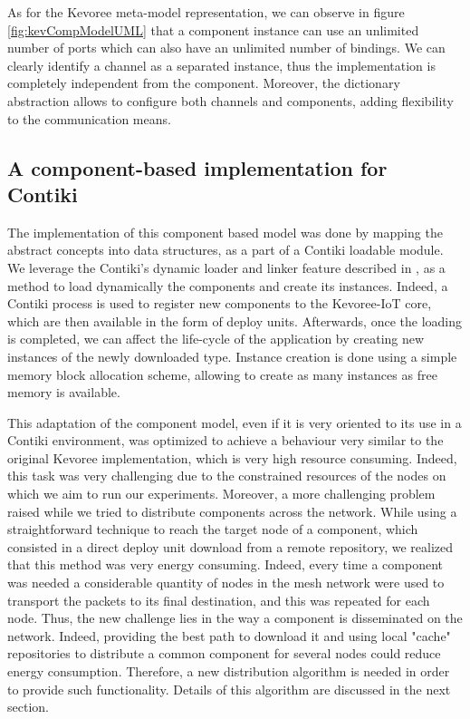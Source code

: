 As for the Kevoree meta-model representation, we can observe in figure \ref{fig:kevCompModelUML} that a component instance can use an unlimited number of ports which can also have an unlimited number of bindings.
We can clearly identify a channel as a separated instance, thus the implementation is completely independent from the component.
Moreover, the dictionary abstraction allows to configure both channels and components, adding flexibility to the communication means.

\subsection*{A component-based implementation for Contiki}
\label{subsec:contikiCompModel}
The implementation of this component based model was done by mapping the abstract concepts into data structures, as a part of a Contiki loadable module.
We leverage the Contiki's dynamic loader and linker feature described in  \cite{dunkels06runtime}, as a method to load dynamically the components and create its instances.
Indeed, a Contiki process is used to register new components to the Kevoree-IoT core, which are then available in the form of deploy units.
Afterwards, once the loading is completed, we can affect the life-cycle of the application by creating new instances of the newly downloaded type.
Instance creation is done using a simple memory block allocation scheme, allowing to create as many instances as free memory is available.

This adaptation of the component model, even if it is very oriented to its use in a Contiki environment, was optimized to achieve a behaviour very similar to the original Kevoree implementation, which is very high resource consuming.
Indeed, this task was very challenging due to the constrained resources of the nodes on which we aim to run our experiments.
Moreover, a more challenging problem raised while we tried to distribute components across the network.
While using a straightforward technique to reach the target node of a component, which consisted in a direct deploy unit download from a remote repository, we realized that this method was very energy consuming.
Indeed, every time a component was needed a considerable quantity of nodes in the mesh network were used to transport the packets to its final destination, and this was repeated for each node.
Thus, the new challenge lies in the way a component is disseminated on the network.
Indeed, providing the best path to download it and using local "cache" repositories to distribute a common component for several nodes could reduce energy consumption.
Therefore, a new distribution algorithm is needed in order to provide such functionality.
Details of this algorithm are discussed in the next section.

